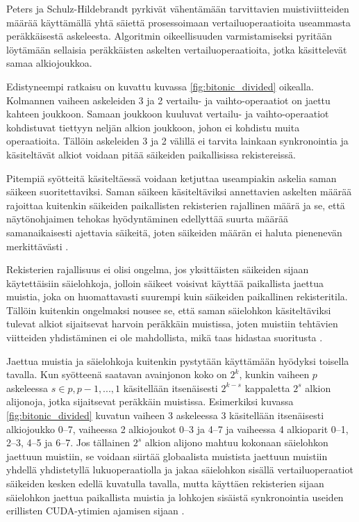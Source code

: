 \documentclass[a4paper,11pt]{article}
\begin{document}
Peters ja Schulz-Hildebrandt \cite{peters2012gems} pyrkivät vähentämään tarvittavien muistiviitteiden määrää käyttämällä yhtä säiettä prosessoimaan vertailuoperaatioita useammasta peräkkäisestä askeleesta. Algoritmin oikeellisuuden varmistamiseksi pyritään löytämään sellaisia peräkkäisten askelten vertailuoperaatioita, jotka käsittelevät samaa alkiojoukkoa.

Edistyneempi ratkaisu on kuvattu kuvassa \ref{fig:bitonic_divided} oikealla. Kolmannen vaiheen askeleiden 3 ja 2 vertailu- ja vaihto-operaatiot on jaettu kahteen joukkoon. Samaan joukkoon kuuluvat vertailu- ja vaihto-operaatiot kohdistuvat tiettyyn neljän alkion joukkoon, johon ei kohdistu muita operaatioita. Tällöin askeleiden 3 ja 2 välillä ei tarvita lainkaan synkronointia ja käsiteltävät alkiot voidaan pitää säikeiden paikallisissa rekistereissä.

Pitempiä syötteitä käsiteltäessä voidaan ketjuttaa useampiakin askelia saman säikeen suoritettaviksi. Saman säikeen käsiteltäviksi annettavien askelten määrää rajoittaa kuitenkin säikeiden paikallisten rekisterien rajallinen määrä ja se, että näytönohjaimen tehokas hyödyntäminen edellyttää suurta määrää samanaikaisesti ajettavia säikeitä, joten säikeiden määrän ei haluta pienenevän merkittävästi \cite{peters2012gems}.

Rekisterien rajallisuus ei olisi ongelma, jos yksittäisten säikeiden sijaan käytettäisiin säielohkoja, jolloin säikeet voisivat käyttää paikallista jaettua muistia, joka on huomattavasti suurempi kuin säikeiden paikallinen rekisteritila. Tällöin kuitenkin ongelmaksi nousee se, että saman säielohkon käsiteltäviksi tulevat alkiot sijaitsevat harvoin peräkkäin muistissa, joten muistiin tehtävien viitteiden yhdistäminen ei ole mahdollista, mikä taas hidastaa suoritusta \cite{peters2012gems}.

Jaettua muistia ja säielohkoja kuitenkin pystytään käyttämään hyödyksi toisella tavalla. Kun syötteenä saatavan avainjonon koko on $2^k$, kunkin vaiheen $p$ askeleessa $s \in p, p-1, ..., 1$ käsitellään itsenäisesti $2^{k-s}$ kappaletta $2^s$ alkion alijonoja, jotka sijaitsevat peräkkäin muistissa. Esimerkiksi kuvassa \ref{fig:bitonic_divided} kuvatun vaiheen 3 askeleessa 3 käsitellään itsenäisesti alkiojoukko 0--7, vaiheessa 2 alkiojoukot 0--3 ja 4--7 ja vaiheessa 4 alkioparit 0--1, 2--3, 4--5 ja 6--7. Jos tällainen $2^s$ alkion alijono mahtuu kokonaan säielohkon jaettuun muistiin, se voidaan siirtää globaalista muistista jaettuun muistiin yhdellä yhdistetyllä lukuoperaatiolla ja jakaa säielohkon sisällä vertailuoperaatiot säikeiden kesken edellä kuvatulla tavalla, mutta käyttäen rekisterien sijaan säielohkon jaettua paikallista muistia ja lohkojen sisäistä synkronointia useiden erillisten CUDA-ytimien ajamisen sijaan \cite{peters2012gems}.
\end{document}

